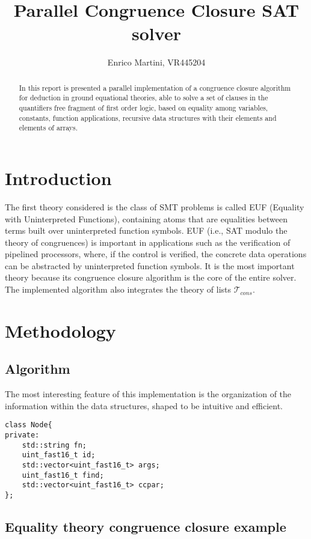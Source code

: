 \documentclass{IEEEtran}
\begin{document}
\title{Parallel Congruence Closure SAT solver}
\author{Enrico Martini, VR445204}
\maketitle
\begin{abstract}
 In this report is presented a parallel implementation of a congruence closure algorithm for deduction in ground equational theories, able to solve a set of clauses in the quantifiers free fragment of first order logic, based on equality among variables, constants, function applications, recursive data structures with their elements and elements of arrays.
\end{abstract}
\section{Introduction}
The first theory considered is the class of SMT problems is called EUF (Equality with Uninterpreted Functions), containing atoms that are equalities between terms built over uninterpreted function symbols. EUF (i.e., SAT modulo the theory of congruences) is important in applications such as the verification of pipelined processors, where, if the control is verified, the concrete data operations can be abstracted by uninterpreted function symbols.\cite{NIEUWENHUIS2007557} It is the most important theory because its congruence closure algorithm is the core of the entire solver. The implemented algorithm also integrates the theory of lists $\mathcal{T}_{cons}$.
\section{Methodology}


\subsection{Algorithm}
The most interesting feature of this implementation is the organization of the information within the data structures, shaped to be intuitive and efficient.
\begin{lstlisting}[style=cpp]
class Node{
private:
	std::string fn;                  
	uint_fast16_t id;                
	std::vector<uint_fast16_t> args; 
	uint_fast16_t find;              
	std::vector<uint_fast16_t> ccpar;
};
\end{lstlisting}

\subsection{Equality theory congruence closure example}
\end{document}
